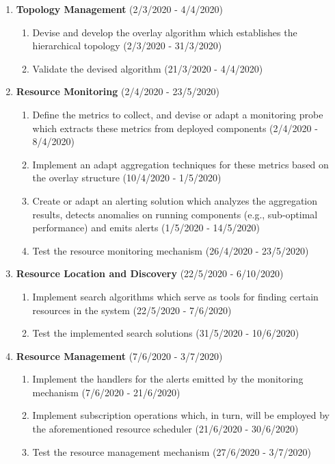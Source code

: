\begin{enumerate}
    \item \textbf{Topology Management} (2/3/2020 - 4/4/2020)
    \begin{enumerate}
        \item Devise and develop the overlay algorithm which establishes the hierarchical topology (2/3/2020 - 31/3/2020)
        \item Validate the devised algorithm (21/3/2020 - 4/4/2020)
    \end{enumerate}
    \item \textbf{Resource Monitoring} (2/4/2020 - 23/5/2020)
    \begin{enumerate}
        \item Define the metrics to collect, and devise or adapt a monitoring probe which extracts these metrics from deployed components (2/4/2020 - 8/4/2020)
        \item Implement an adapt aggregation techniques for these metrics based on the overlay structure (10/4/2020 - 1/5/2020)
        \item Create or adapt an alerting solution which analyzes the aggregation results, detects anomalies on running components (e.g., sub-optimal performance) and emits alerts (1/5/2020 - 14/5/2020)
        \item Test the resource monitoring mechanism (26/4/2020 - 23/5/2020)
    \end{enumerate}
    \item \textbf{Resource Location and Discovery} (22/5/2020 - 6/10/2020)
    \begin{enumerate}
        \item Implement search algorithms which serve as tools for finding certain resources in the system (22/5/2020 - 7/6/2020)
        \item Test the implemented search solutions (31/5/2020 - 10/6/2020)
    \end{enumerate}
    \item \textbf{Resource Management} (7/6/2020 - 3/7/2020)
    \begin{enumerate}
        \item Implement the handlers for the alerts emitted by the monitoring mechanism (7/6/2020 - 21/6/2020)
        \item Implement subscription operations which, in turn, will be employed by the aforementioned resource scheduler (21/6/2020 - 30/6/2020)
        \item Test the resource management mechanism (27/6/2020 - 3/7/2020)

\end{enumerate}
\end{enumerate}
